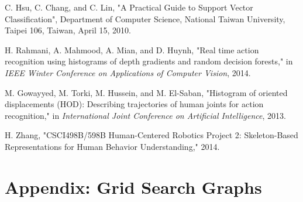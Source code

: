 \documentclass[11pt,nocopyrightspace]{config}
\begin{document}




\begin{thebibliography}{}
\softraggedright

C. Hsu, C. Chang, and C. Lin, "A Practical Guide to Support Vector Classification", Department of Computer Science, National Taiwan University, Taipei 106, Taiwan, April 15, 2010.

H. Rahmani, A. Mahmood, A. Mian, and D. Huynh, "Real time action recognition using histograms of depth gradients and random decision forests," in \textit{IEEE Winter Conference on Applications of Computer Vision}, 2014.

M. Gowayyed, M. Torki, M. Hussein, and M. El-Saban, "Histogram of oriented displacements (HOD): Describing trajectories of human joints for action recognition," in \textit{International Joint Conference on Artificial Intelligence}, 2013.

H. Zhang, "CSCI498B/598B Human-Centered Robotics Project 2: Skeleton-Based Representations for Human Behavior Understanding," 2014.

\end{thebibliography}

\appendix
\section{Appendix: Grid Search Graphs}
\end{document}
